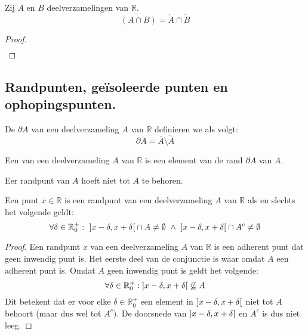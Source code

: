 \documentclass[main.tex]{subfiles}
\begin{document}
\begin{st}
  Zij $A$ en $B$ deelverzamelingen van $\mathbb{R}$.
  \[ \mathring{\left(A \cap B\right)} = \mathring{A} \cap \mathring{B} \]

  \begin{proof}
    \[
    \begin{array}{rll}
    \end{array}
    \]
  \end{proof}
\feed
{}
\end{st}

\subsection{Randpunten, ge\"isoleerde punten en ophopingspunten.}
\label{sec:randp-geis-punt}

\begin{de}
  De  $\partial A$ van een deelverzameling $A$ van $\mathbb{R}$ definieren we als volgt:
  \[ \partial A = \bar{A} \setminus \mathring{A} \]
\end{de}

\begin{de}
  Een  van een deelverzameling $A$ van $\mathbb{R}$ is een element van de rand $\partial A$ van $A$.
\end{de}

\begin{opm}
  Eer randpunt van $A$ hoeft niet tot $A$ te behoren.
\end{opm}

\begin{st}
  Een punt $x\in \mathbb{R}$ is een randpunt van een deelverzameling $A$ van $\mathbb{R}$ als en slechts het volgende geldt:
  \[ \forall \delta \in \mathbb{R}_{0}^{+}:\ \interval[open]{x-\delta}{x+\delta} \cap A \neq \emptyset\ \wedge\  \interval[open]{x-\delta}{x+\delta} \cap A^{c} \neq \emptyset \]

  \begin{proof}
    Een randpunt $x$ van een deelverzameling $A$ van $\mathbb{R}$ is een adherent punt dat geen inwendig punt is.
    Het eerste deel van de conjunctie is waar omdat $A$ een adherent punt is.
    Omdat $A$ geen inwendig punt is geldt het volgende:
    \[ \forall \delta \in \mathbb{R}_{0}^{+}: \interval[open]{x-\delta}{x+\delta} \not\subseteq A \]
    Dit betekent dat er voor elke $\delta \in \mathbb{R}_{0}^{+}$ een element in $\interval[open]{x-\delta}{x+\delta}$ niet tot $A$ behoort (maar dus wel tot $A^{c}$).
    De doorsnede van $\interval[open]{x-\delta}{x+\delta}$ en $A^{c}$ is dus niet leeg.
  \end{proof}
\end{st}
\end{document}
